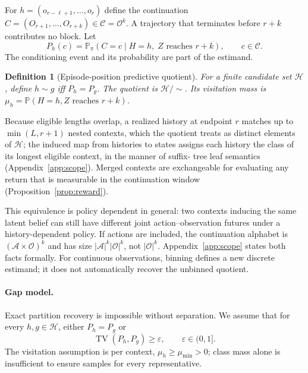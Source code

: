 \documentclass{article}
\newtheorem{definition}{Definition}
\newcommand{\cA}{\mathcal A}
\newcommand{\cC}{\mathcal C}
\newcommand{\cH}{\mathcal H}
\newcommand{\cO}{\mathcal O}
\newcommand{\Prb}{\mathbb P}
\newcommand{\eps}{\varepsilon}
\DeclareMathOperator{\TV}{TV}
\begin{document}
For $h=(o_{r-\ell+1},\ldots,o_r)$ define the continuation
$C=(O_{r+1},\ldots,O_{r+k})\in\cC=\cO^k$.  A trajectory that terminates before
$r+k$ contributes no block.  Let
\begin{equation}
  P_h(c)=\Prb_\pi(C=c\mid H=h,\; Z\text{ reaches }r+k),
  \qquad c\in\cC.                                      \label{eq:law}
\end{equation}
The conditioning event and its probability are part of the estimand.

\begin{definition}[Episode-position predictive quotient]
For a finite candidate set $\cH$, define $h\sim g$ iff $P_h=P_g$.  The
quotient is $\cH/{\sim}$.  Its visitation mass is
$\mu_h=\Prb(H=h, Z\text{ reaches }r+k)$.
\end{definition}

Because eligible lengths overlap, a realized history at endpoint $r$ matches
up to $\min(L,r+1)$ nested contexts, which the quotient treats as distinct
elements of $\cH$; the induced map from histories to states assigns each
history the class of its longest eligible context, in the manner of suffix-
tree leaf semantics (Appendix~\ref{app:scope}).  Merged contexts are
exchangeable for evaluating any return that is measurable in the
continuation window (Proposition~\ref{prop:reward}).

This equivalence is policy dependent in general: two contexts inducing the
same latent belief can still have different joint action--observation futures
under a history-dependent policy.  If actions are included, the continuation
alphabet is $(\cA\times\cO)^k$ and has size
$|\cA|^k|\cO|^k$, not $|\cO|^k$.  Appendix~\ref{app:scope} states both facts
formally.  For continuous observations, binning defines a new discrete
estimand; it does not automatically recover the unbinned quotient.

\paragraph{Gap model.}
Exact partition recovery is impossible without separation.  We assume that
for every $h,g\in\cH$, either $P_h=P_g$ or
\begin{equation}
  \TV(P_h,P_g)\ge\eps, \qquad \eps\in(0,1].             \label{eq:gap}
\end{equation}
The visitation assumption is per context, $\mu_h\ge\mu_{\min}>0$; class mass
alone is insufficient to ensure samples for every representative.
\end{document}

